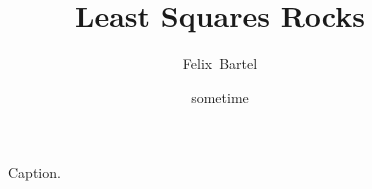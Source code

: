 \documentclass[
    10pt,
    toc = bib,
    headsepline,
    chapterprefix = true,
    headings = small,
    parskip = never,
]{scrbook}
\title{Least Squares Rocks}
\author{Felix~Bartel}
\date{sometime}
\begin{document}
\begin{figure}
    \centering
    
    \caption{Caption.}
\end{figure}
\lipsum[1]
\end{document}

